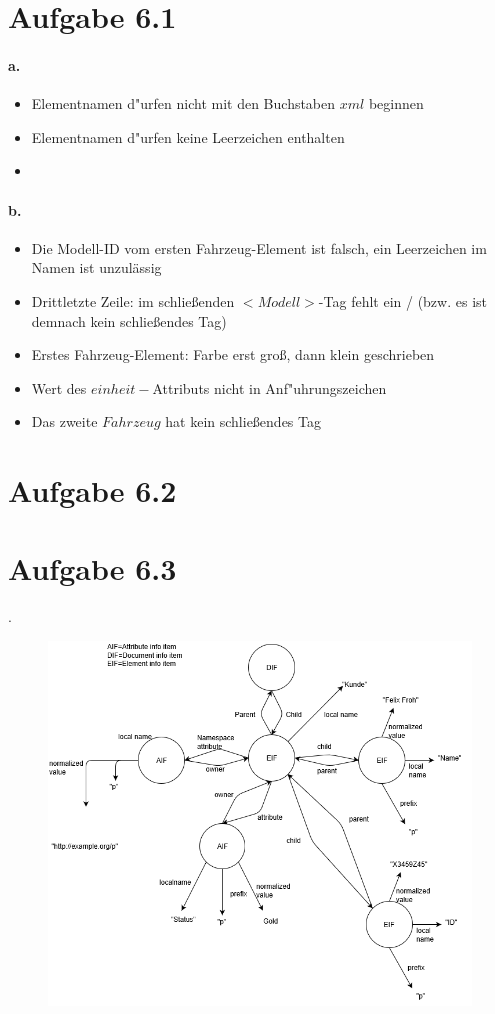 \documentclass{scrartcl}
\begin{document}
	
	

	
	\section*{Aufgabe 6.1}
		\paragraph*{a.}
			\begin{itemize}
				\item Elementnamen d"urfen nicht mit den Buchstaben $ xml $ beginnen
				\item Elementnamen d"urfen keine Leerzeichen enthalten
				\item 
			\end{itemize}
		
		\paragraph*{b.}
			\begin{itemize}
				\item Die Modell-ID vom ersten Fahrzeug-Element ist falsch, ein Leerzeichen im Namen ist unzulässig
				\item Drittletzte Zeile: im schließenden $ <Modell> $-Tag fehlt ein  / (bzw. es ist demnach kein schließendes Tag)
				\item Erstes Fahrzeug-Element: Farbe erst groß, dann klein geschrieben
				\item Wert des $ einheit-$Attributs nicht in Anf"uhrungszeichen 
				\item Das zweite $ Fahrzeug $ hat kein schließendes Tag	
			\end{itemize}
	
	\section*{Aufgabe 6.2}
		
		
	\pagebreak
	\section*{Aufgabe 6.3}.
		\begin{figure}[h]
			\includegraphics[scale=0.75]{aufgabe_6_3.png}
		\end{figure}
		
\end{document}
